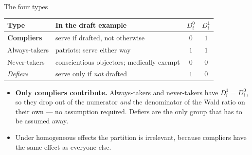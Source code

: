 \documentclass[
  11pt,
  ignorenonframetext,
  aspectratio=169,
]{beamer}
\providecommand{\tightlist}{%
  \setlength{\itemsep}{0pt}\setlength{\parskip}{0pt}}
\begin{document}
\begin{frame}{The four types}
\protect{}\label{the-four-types}
\begin{center}
\small
\begin{tabular}{llcc}
\toprule
Type & In the draft example & $D^0_i$ & $D^1_i$ \\
\midrule
\textbf{Compliers}    & serve if drafted, not otherwise        & $0$ & $1$ \\
Always-takers         & patriots: serve either way             & $1$ & $1$ \\
Never-takers          & conscientious objectors; medically exempt & $0$ & $0$ \\
\textit{Defiers}      & serve only if \emph{not} drafted        & $1$ & $0$ \\
\bottomrule
\end{tabular}
\end{center}

\begin{itemize}
\tightlist
\item
  \textbf{Only compliers contribute.} Always-takers and never-takers
  have \(D^1_i = D^0_i\), so they drop out of the numerator \emph{and}
  the denominator of the Wald ratio on their own --- no assumption
  required. Defiers are the only group that has to be assumed away.
\item
  Under homogeneous effects the partition is irrelevant, because
  compliers have the same effect as everyone else.
\end{itemize}
\end{frame}
\end{document}
